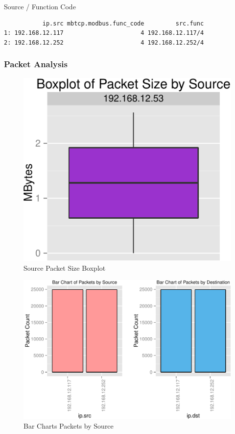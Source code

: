 \documentclass[12pt,]{article}
\begin{document}
Source / Function Code

\begin{verbatim}
           ip.src mbtcp.modbus.func_code         src.func
1: 192.168.12.117                      4 192.168.12.117/4
2: 192.168.12.252                      4 192.168.12.252/4
\end{verbatim}

\nopagebreak

\subsubsection{Packet Analysis}\label{packet-analysis}

\begin{figure}

{\centering \includegraphics{thesis_files/figure-latex/unnamed-chunk-21-1} 

}

\caption{Source Packet Size Boxplot}\label{fig:unnamed-chunk-21}
\end{figure}

\begin{figure}

{\centering \includegraphics{thesis_files/figure-latex/unnamed-chunk-22-1} 

}

\caption{Bar Charts Packets by Source}\label{fig:unnamed-chunk-22}
\end{figure}
\end{document}
